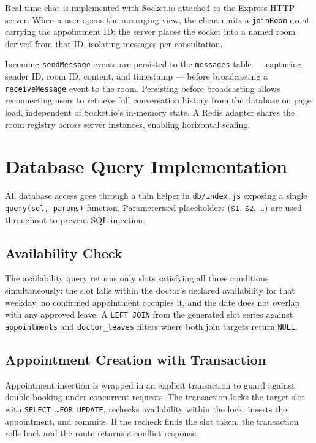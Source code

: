 Real-time chat is implemented with Socket.io attached to the Express HTTP server. When a user opens the messaging view, the client emits a \texttt{joinRoom} event carrying the appointment ID; the server places the socket into a named room derived from that ID, isolating messages per consultation.

\noindent
Incoming \texttt{sendMessage} events are persisted to the \texttt{messages} table — capturing sender ID, room ID, content, and timestamp — before broadcasting a \texttt{receiveMessage} event to the room. Persisting before broadcasting allows reconnecting users to retrieve full conversation history from the database on page load, independent of Socket.io's in-memory state. A Redis adapter shares the room registry across server instances, enabling horizontal scaling.

\section{Database Query Implementation}
\label{sec:db-queries}

All database access goes through a thin helper in \texttt{db/index.js} exposing a single \texttt{query(sql, params)} function. Parameterised placeholders (\texttt{\$1}, \texttt{\$2}, \ldots) are used throughout to prevent SQL injection.

\subsection{Availability Check}
\label{subsec:avail-query}

The availability query returns only slots satisfying all three conditions simultaneously: the slot falls within the doctor's declared availability for that weekday, no confirmed appointment occupies it, and the date does not overlap with any approved leave. A \texttt{LEFT JOIN} from the generated slot series against \texttt{appointments} and \texttt{doctor\_leaves} filters where both join targets return \texttt{NULL}.

\subsection{Appointment Creation with Transaction}
\label{subsec:appt-transaction}

Appointment insertion is wrapped in an explicit transaction to guard against double-booking under concurrent requests. The transaction locks the target slot with \texttt{SELECT \ldots FOR UPDATE}, rechecks availability within the lock, inserts the appointment, and commits. If the recheck finds the slot taken, the transaction rolls back and the route returns a conflict response.

